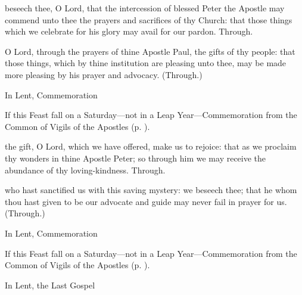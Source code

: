 
\clearpage
\secret
{} beseech thee, O Lord, that the intercession of blessed Peter the Apostle may commend unto thee the prayers and sacrifices of thy Church: that those things which we celebrate for his glory may avail for our pardon. Through.

 O Lord, through the prayers of thine Apostle Paul, the gifts of thy people: that those things, which by thine institution are pleasing unto thee, may be made more pleasing by his prayer and advocacy. (Through.)
\begin{rubric}
    In Lent, Commemoration %
\end{rubric}
\begin{rubric}
    If this Feast fall on a Saturday---not in a Leap Year---Commemoration  from the Common of Vigils of the Apostles (p. \pageref{CommonVigilApostles}).
\end{rubric}


\postcommunion
{} the gift, O Lord, which we have offered, make us to rejoice: that as we proclaim thy wonders in thine Apostle Peter; so through him we may receive the abundance of thy loving-kindness. Through.


 who hast sanctified us with this saving mystery: we beseech thee; that he whom thou hast given to be our advocate and guide may never fail in prayer for us. (Through.)
\begin{rubric}
    In Lent, Commemoration %
\end{rubric}
\begin{rubric}
    If this Feast fall on a Saturday---not in a Leap Year---Commemoration  from the Common of Vigils of the Apostles (p. \pageref{CommonVigilApostles}).
\end{rubric}

\begin{rubric}
    In Lent, the Last Gospel 
\end{rubric}



